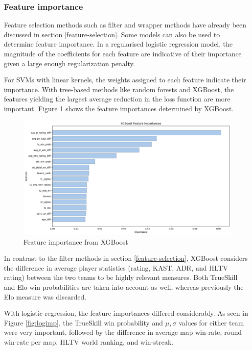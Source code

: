 \subsubsection{Feature importance}

Feature selection methods such as filter and wrapper methods have already been discussed in section \ref{feature-selection}. Some models can also be used to determine feature importance. In a regularised logistic regression model, the magnitude of the coefficients for each feature are indicative of their importance given a large enough regularization penalty. 

\newpage
For SVMs with linear kernels, the weights assigned to each feature indicate their importance. With tree-based methods like random forests and XGBoost, the features yielding the largest average reduction in the loss function are more important. Figure \ref{fig:xgbimp} shows the feature importances determined by XGBoost.

\begin{figure}[h]
	\centering
	\begin{adjustbox}{center}
		\includegraphics[width=1.3\textwidth]{Figures/xgb-imp.png}
	\end{adjustbox}
	\caption{Feature importance from XGBoost}
	\label{fig:xgbimp}
\end{figure}

In contrast to the filter methods in section \ref{feature-selection}, XGBoost considers the difference in average player statistics (rating, KAST, ADR, and HLTV rating) between the two teams to be highly relevant measures. Both TrueSkill and Elo win probabilities are taken into account as well, whereas previously the Elo measure was discarded. 

With logistic regression, the feature importances differed considerably. As seen in Figure \ref{fig:logimp}, the TrueSkill win probability and $\mu,\sigma$ values for either team were very important, followed by the difference in average map win-rate, round win-rate per map. HLTV world ranking, and win-streak.


